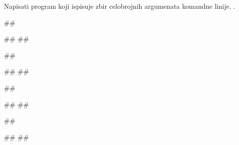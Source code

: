 \begin{Exercise}[label=p2.6_01] 
Napisati program koji ispisuje zbir celobrojnih argumenata komandne linije. 
.

\begin{miditest}
\begin{upotreba}{1}
##

#\naslovIzlaz#
##
\end{upotreba}
\end{miditest}
\begin{miditest}
\begin{upotreba}{2}
##

#\naslovIzlaz#
##
\end{upotreba}
\end{miditest}

\begin{miditest}
\begin{upotreba}{3}
##

#\naslovIzlaz#
##
\end{upotreba}
\end{miditest}
\begin{miditest}
\begin{upotreba}{4}
##

#\naslovIzlaz#
##
\end{upotreba}
\end{miditest}
\end{Exercise}
\ifresenja
\begin{Answer}[ref=p2.6_01]
\end{Answer}
 \fi

